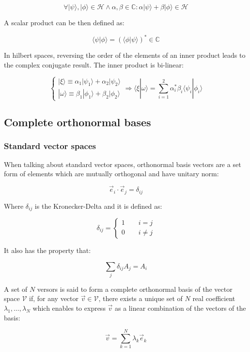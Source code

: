 		$$\forall |\psi\rangle,|\phi\rangle\in\mathcal{H}\land \alpha,\beta\in\mathbb{C}: \alpha|\psi\rangle + \beta|\phi\rangle\in\mathcal{H}$$

		A scalar product can be then defined as:

		$$\langle\psi|\phi\rangle = (\langle\phi|\psi\rangle)^*\in\mathbb{C}$$

		In hilbert spaces, reversing the order of the elements of an inner product leads to the complex conjugate result.
		The inner product is bi-linear:

		$$\begin{cases}|\xi\rangle \equiv \alpha_1|\psi_1\rangle + \alpha_2|\psi_2\rangle\\|\omega\rangle \equiv \beta_1|\phi_1\rangle + \beta_2|\phi_2\rangle\end{cases}\Rightarrow \langle\xi|\omega\rangle = \sum\limits_{i=1}^2\alpha_i^*\beta_i\langle \psi_i|\phi_i\rangle$$

	\subsection{Complete orthonormal bases}

		\subsubsection{Standard vector spaces}
		When talking about standard vector spaces, orthonormal basis vectors are a set form of elements which are mutually orthogonal and have unitary norm:

		$$\vec{e}_i\cdot\vec{e}_j = \delta_{ij}$$

		Where $\delta_{ij}$ is the Kronecker-Delta and it is defined as:

		$$\delta_{ij} = \begin{cases}1\qquad i = j\\ 0\qquad i\neq j\end{cases}$$

		It also has the property that:

		$$\sum\limits_j\delta_{ij}A_j = A_i$$

		A set of $N$ versors is said to form a complete orthonormal basis of the vector space $\mathcal{V}$ if, for any vector $\vec{v}\in\mathcal{V}$, there exists a unique set of $N$ real coefficient $\lambda_1, \dots, \lambda_N$ which enables to express $\vec{v}$ as a linear combination of the vectors of the basis:

		$$\vec{v} = \sum\limits_{k=1}^N\lambda_k\vec{e}_k$$

